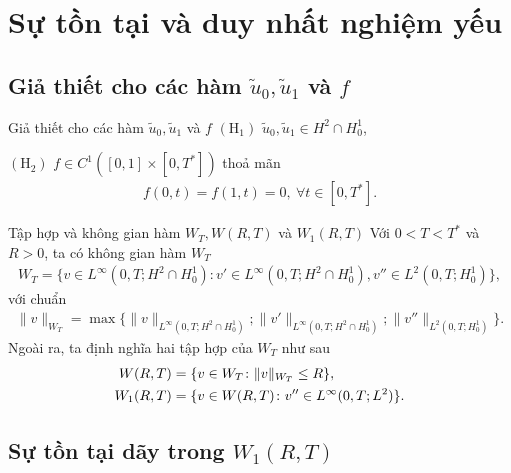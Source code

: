\documentclass[9pt]{beamer}
\begin{document}
\section{Sự tồn tại và duy nhất nghiệm yếu}

\subsection{Giả thiết cho các hàm $\tilde{u}_0, \tilde{u}_1$ và $f$}

\begin{frame}
    \begin{block}{Giả thiết cho các hàm $\tilde{u}_0, \tilde{u}_1$ và $f$}
    $(\text{H}_1)$ $\tilde{u}_0, \tilde{u}_1 \in H^2 \cap H^1_0$,

    $(\text{H}_2)$ $f \in C^1([0,1]\times[0,T^*])$ thoả mãn
    \begin{align*}
        f(0,t) = f(1,t) = 0, \ \forall t \in [0,T^*].
    \end{align*}
    \end{block}

    \begin{exampleblock}{Tập hợp và không gian hàm $W_T, W(R,T)$ và $W_1(R,T)$}
    Với $0 < T < T^*$ và $R > 0$, ta có không gian hàm $W_T$
    \begin{align}
        W_T = \{ v \in L^\infty (0,T;H^2 \cap H^1_0) \colon v' \in L^\infty (0,T; H^2 \cap H^1_0), v'' \in L^2(0,T; H^1_0) \},
    \end{align}
    với chuẩn
    \begin{align}
        \|v\|_{W_T} = \max \{ \|v\|_{L^\infty(0,T;H^2 \cap H^1_0)} ; \|v'\|_{L^\infty(0,T;H^2 \cap H^1_0)}; \|v''\|_{ L^2(0,T;H^1_0)} \}.
    \end{align}
    Ngoài ra, ta định nghĩa hai tập hợp của $W_T$ như sau
    \begin{align}
        W(R,T) &= \{ v \in W_T \colon \|v\|_{W_T} \le R \}, \\
        W_1(R,T) &= \{ v \in W(R,T) \colon v'' \in L^\infty(0,T;L^2) \}. \notag
    \end{align}
    \end{exampleblock}
\end{frame}

\subsection{Sự tồn tại dãy trong $W_1(R,T)$}
\end{document}
